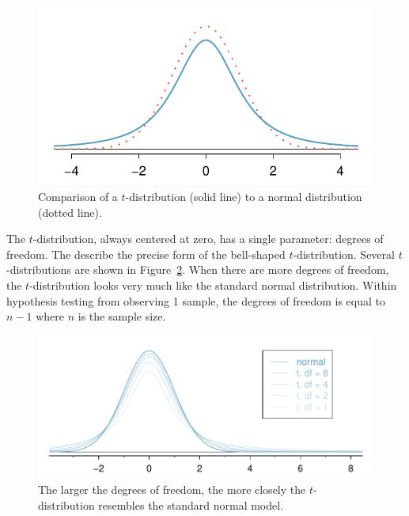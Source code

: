 \begin{figure}
\centering
\includegraphics[width = \textwidth]{ch_inference_foundations_oi_biostat/figures/tDistCompareToNormalDist/tDistCompareToNormalDist}
\caption{Comparison of a $t$-distribution (solid line) to a normal distribution (dotted line).}
\label{tDistCompareToNormalDist}
\end{figure}

The $t$-distribution, always centered at zero, has a single parameter: degrees of freedom. The  describe the precise form of the bell-shaped $t$-distribution. Several $t$-distributions are shown in Figure~\ref{tDistConvergeToNormalDist}. When there are more degrees of freedom, the $t$-distribution looks very much like the standard normal distribution. Within hypothesis testing from observing 1 sample, the degrees of freedom is equal to $n-1$ where $n$ is the sample size.

\begin{figure}
\centering
\includegraphics[width=\textwidth]{ch_inference_foundations_oi_biostat/figures/tDistConvergeToNormalDist/tDistConvergeToNormalDist}
\caption{The larger the degrees of freedom, the more closely the $t$-distribution resembles the standard normal model.}
\label{tDistConvergeToNormalDist}
\end{figure}

